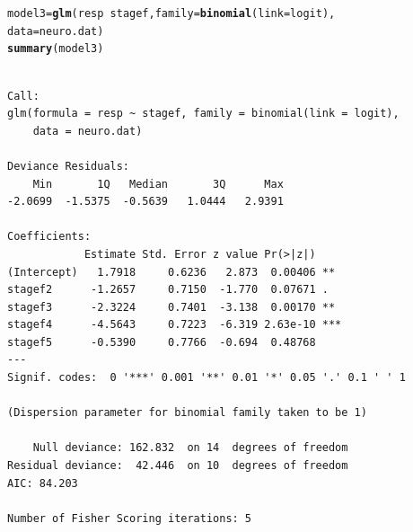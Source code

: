 \documentclass[oneside]{book}\usepackage[]{graphicx}\usepackage[svgnames]{xcolor}
\makeatletter
\newcommand{\hlopt}[1]{\textcolor[rgb]{0,0,0}{#1}}%
\newcommand{\hlstd}[1]{\textcolor[rgb]{0.345,0.345,0.345}{#1}}%
\newcommand{\hlkwb}[1]{\textcolor[rgb]{0.69,0.353,0.396}{#1}}%
\newcommand{\hlkwc}[1]{\textcolor[rgb]{0.333,0.667,0.333}{#1}}%
\newcommand{\hlkwd}[1]{\textcolor[rgb]{0.737,0.353,0.396}{\textbf{#1}}}%
\newenvironment{kframe}{%
 \def\at@end@of@kframe{}%
 \ifinner\ifhmode%
  \def\at@end@of@kframe{\end{minipage}}%
  \begin{minipage}{\columnwidth}%
 \fi\fi%
 \def\FrameCommand##1{\hskip\@totalleftmargin \hskip-\fboxsep
 \colorbox{shadecolor}{##1}\hskip-\fboxsep
     \hskip-\linewidth \hskip-\@totalleftmargin \hskip\columnwidth}%
 \MakeFramed {\advance\hsize-\width
   \@totalleftmargin\z@ \linewidth\hsize
   \@setminipage}}%
 {\par\unskip\endMakeFramed%
 \at@end@of@kframe}
\newenvironment{knitrout}{}{} %
\makeatother
\begin{document}
\begin{knitrout}
\color{fgcolor}\begin{kframe}
\begin{alltt}
\hlstd{model3} \hlkwb{=} \hlkwd{glm}\hlstd{(resp} \hlopt{~} \hlstd{stagef,} \hlkwc{family} \hlstd{=} \hlkwd{binomial}\hlstd{(}\hlkwc{link} \hlstd{= logit),}
  \hlkwc{data} \hlstd{= neuro.dat)}
\hlkwd{summary}\hlstd{(model3)}
\end{alltt}
\begin{verbatim}

Call:
glm(formula = resp ~ stagef, family = binomial(link = logit), 
    data = neuro.dat)

Deviance Residuals: 
    Min       1Q   Median       3Q      Max  
-2.0699  -1.5375  -0.5639   1.0444   2.9391  

Coefficients:
            Estimate Std. Error z value Pr(>|z|)    
(Intercept)   1.7918     0.6236   2.873  0.00406 ** 
stagef2      -1.2657     0.7150  -1.770  0.07671 .  
stagef3      -2.3224     0.7401  -3.138  0.00170 ** 
stagef4      -4.5643     0.7223  -6.319 2.63e-10 ***
stagef5      -0.5390     0.7766  -0.694  0.48768    
---
Signif. codes:  0 '***' 0.001 '**' 0.01 '*' 0.05 '.' 0.1 ' ' 1

(Dispersion parameter for binomial family taken to be 1)

    Null deviance: 162.832  on 14  degrees of freedom
Residual deviance:  42.446  on 10  degrees of freedom
AIC: 84.203

Number of Fisher Scoring iterations: 5
\end{verbatim}
\end{kframe}
\end{knitrout}
\end{document}
